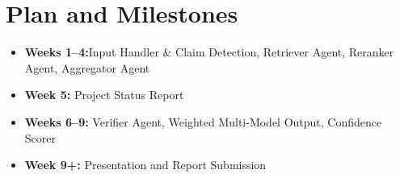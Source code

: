\documentclass[11pt]{article}
\begin{document}
\section{Plan and Milestones}
\begin{itemize}[leftmargin=1em]
  \item \textbf{Weeks 1--4:}Input Handler & Claim Detection, Retriever Agent, Reranker Agent, Aggregator Agent  
  \item \textbf{Week 5:} Project Status Report 
  \item \textbf{Weeks 6--9:} Verifier Agent, Weighted Multi-Model Output, Confidence Scorer 
  \item \textbf{Week 9+:} Presentation and Report Submission  
  
\end{itemize}




\end{document}
